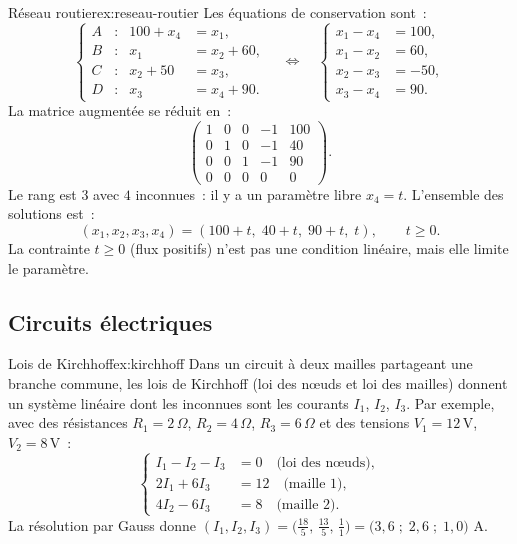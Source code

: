 \begin{example}{Réseau routier}{ex:reseau-routier}
  Les équations de conservation sont~:
  \[
    \left\{
    \begin{aligned}
      A&: & 100+x_4 &= x_1, \\
      B&: & x_1 &= x_2+60, \\
      C&: & x_2+50 &= x_3, \\
      D&: & x_3 &= x_4+90.
    \end{aligned}
    \right.
    \quad\Longleftrightarrow\quad
    \left\{
    \begin{aligned}
      x_1 - x_4 &= 100, \\
      x_1 - x_2 &= 60, \\
      x_2 - x_3 &= -50, \\
      x_3 - x_4 &= 90.
    \end{aligned}
    \right.
  \]
  La matrice augmentée se réduit en~:
  \[
    \left(\begin{array}{cccc|c}
      1 & 0 & 0 & -1 & 100\\
      0 & 1 & 0 & -1 & 40\\
      0 & 0 & 1 & -1 & 90\\
      0 & 0 & 0 & 0 & 0
    \end{array}\right).
  \]
  Le rang est $3$ avec $4$ inconnues~: il y a un paramètre libre $x_4=t$.
  L'ensemble des solutions est~:
  \[
    (x_1,x_2,x_3,x_4)=(100+t,\;40+t,\;90+t,\;t),\qquad t\geqslant 0.
  \]
  La contrainte $t\geqslant 0$ (flux positifs) n'est pas une condition
  linéaire, mais elle limite le paramètre.
\end{example}

\subsection{Circuits électriques}\label{subsec:circuits}

\begin{example}{Lois de Kirchhoff}{ex:kirchhoff}
  Dans un circuit à deux mailles partageant une branche commune, les lois
  de Kirchhoff (loi des n\oe{}uds et loi des mailles) donnent un système
  linéaire dont les inconnues sont les courants $I_1$, $I_2$, $I_3$.
  Par exemple, avec des résistances $R_1=2\,\Omega$, $R_2=4\,\Omega$,
  $R_3=6\,\Omega$ et des tensions $V_1=12\,$V, $V_2=8\,$V~:
  \[
    \left\{
    \begin{aligned}
      I_1 - I_2 - I_3 &= 0 \quad\text{(loi des n\oe{}uds)},\\
      2I_1 + 6I_3 &= 12 \quad\text{(maille 1)},\\
      4I_2 - 6I_3 &= 8 \quad\text{(maille 2)}.
    \end{aligned}
    \right.
  \]
  La résolution par Gauss donne
  $(I_1, I_2, I_3)=\bigl(\frac{18}{5},\,\frac{13}{5},\,\frac{1}{1}\bigr)
  =\bigl(3{,}6\;;\;2{,}6\;;\;1{,}0\bigr)$ A.
\end{example}

